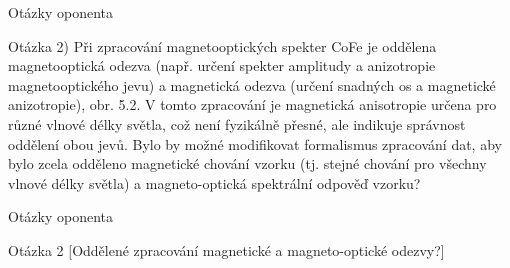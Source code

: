 \begin{frame}{Otázky oponenta}
    \begin{block}{Otázka 2)}
        Při zpracování magnetooptických spekter CoFe je oddělena magnetooptická odezva (např. určení spekter amplitudy a anizotropie magnetooptického jevu) a magnetická odezva (určení snadných os a magnetické anizotropie), obr. 5.2.
        V tomto zpracování je magnetická anisotropie určena pro různé vlnové délky světla, což není fyzikálně přesné, ale indikuje správnost oddělení obou jevů.
        Bylo by možné modifikovat formalismus zpracování dat, aby bylo zcela odděleno magnetické chování vzorku (tj. stejné chování pro všechny vlnové délky světla) a magneto-optická spektrální odpověď vzorku?
    \end{block}
\end{frame}
\begin{frame}{Otázky oponenta}
    \begin{block}{Otázka 2}
        [Oddělené zpracování magnetické a magneto-optické odezvy?]
    \end{block}
    

\end{frame}
